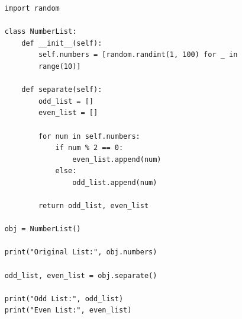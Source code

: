 \begin{verbatim}
    import random
    
    class NumberList:
        def __init__(self):
            self.numbers = [random.randint(1, 100) for _ in 
            range(10)]
    
        def separate(self):
            odd_list = []
            even_list = []
    
            for num in self.numbers:
                if num % 2 == 0:
                    even_list.append(num)
                else:
                    odd_list.append(num)
    
            return odd_list, even_list
    
    obj = NumberList()
    
    print("Original List:", obj.numbers)
    
    odd_list, even_list = obj.separate()
    
    print("Odd List:", odd_list)
    print("Even List:", even_list)
\end{verbatim}